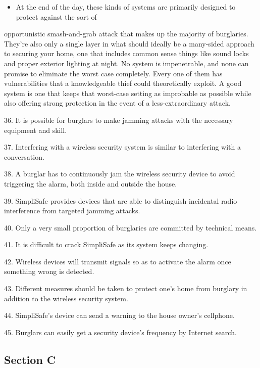 \documentclass[UTF8,11pt]{ctexart}
\begin{document}
\begin{itemize}[leftmargin=2em,itemsep=.2em,topsep=.4em]\item[K.] At the end of the day, these kinds of systems are primarily designed to protect against the sort of
\end{itemize}

opportunistic smash-and-grab attack that makes up the majority of burglaries. They're also only a single layer in what should ideally be a many-sided approach to securing your home, one that includes common sense things like sound locks and proper exterior lighting at night. No system is impenetrable, and none can promise to eliminate the worst case completely. Every one of them has vulnerabilities that a knowledgeable thief could theoretically exploit. A good system is one that keeps that worst-case setting as improbable as possible while also offering strong protection in the event of a less-extraordinary attack.


36. It is possible for burglars to make jamming attacks with the necessary equipment and skill.


37. Interfering with a wireless security system is similar to interfering with a conversation.


38. A burglar has to continuously jam the wireless security device to avoid triggering the alarm, both inside and outside the house.


39. SimpliSafe provides devices that are able to distinguish incidental radio interference from targeted jamming attacks.


40. Only a very small proportion of burglaries are committed by technical means.


41. It is difficult to crack SimpliSafe as its system keeps changing.


42. Wireless devices will transmit signals so as to activate the alarm once something wrong is detected.


43. Different measures should be taken to protect one's home from burglary in addition to the wireless security system.


44. SimpliSafe's device can send a warning to the house owner's cellphone.


45. Burglars can easily get a security device's frequency by Internet search.


\subsection*{\textbf{Section C}}
\end{document}
